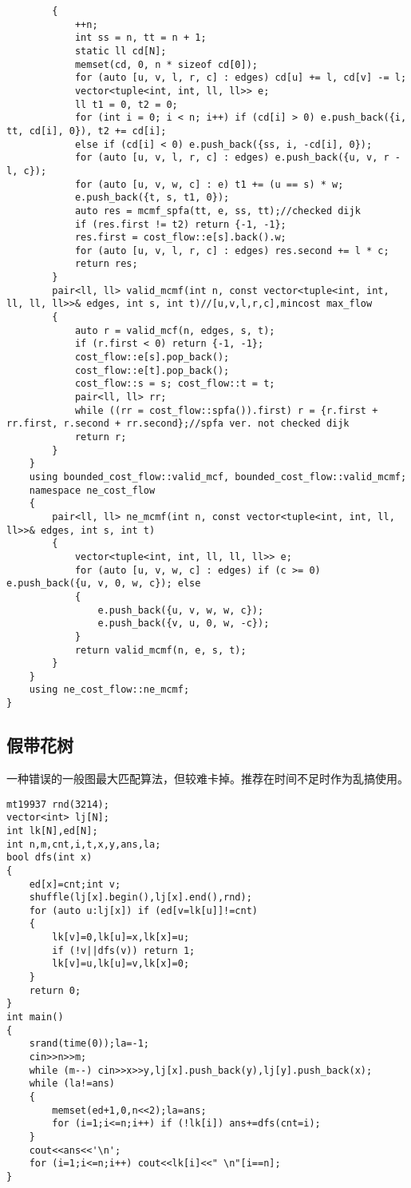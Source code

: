 \documentclass[12pt]{ctexart}
\begin{document}
\begin{lstlisting}
		{
			++n;
			int ss = n, tt = n + 1;
			static ll cd[N];
			memset(cd, 0, n * sizeof cd[0]);
			for (auto [u, v, l, r, c] : edges) cd[u] += l, cd[v] -= l;
			vector<tuple<int, int, ll, ll>> e;
			ll t1 = 0, t2 = 0;
			for (int i = 0; i < n; i++) if (cd[i] > 0) e.push_back({i, tt, cd[i], 0}), t2 += cd[i];
			else if (cd[i] < 0) e.push_back({ss, i, -cd[i], 0});
			for (auto [u, v, l, r, c] : edges) e.push_back({u, v, r - l, c});
			for (auto [u, v, w, c] : e) t1 += (u == s) * w;
			e.push_back({t, s, t1, 0});
			auto res = mcmf_spfa(tt, e, ss, tt);//checked dijk
			if (res.first != t2) return {-1, -1};
			res.first = cost_flow::e[s].back().w;
			for (auto [u, v, l, r, c] : edges) res.second += l * c;
			return res;
		}
		pair<ll, ll> valid_mcmf(int n, const vector<tuple<int, int, ll, ll, ll>>& edges, int s, int t)//[u,v,l,r,c],mincost max_flow
		{
			auto r = valid_mcf(n, edges, s, t);
			if (r.first < 0) return {-1, -1};
			cost_flow::e[s].pop_back();
			cost_flow::e[t].pop_back();
			cost_flow::s = s; cost_flow::t = t;
			pair<ll, ll> rr;
			while ((rr = cost_flow::spfa()).first) r = {r.first + rr.first, r.second + rr.second};//spfa ver. not checked dijk
			return r;
		}
	}
	using bounded_cost_flow::valid_mcf, bounded_cost_flow::valid_mcmf;
	namespace ne_cost_flow
	{
		pair<ll, ll> ne_mcmf(int n, const vector<tuple<int, int, ll, ll>>& edges, int s, int t)
		{
			vector<tuple<int, int, ll, ll, ll>> e;
			for (auto [u, v, w, c] : edges) if (c >= 0) e.push_back({u, v, 0, w, c}); else
			{
				e.push_back({u, v, w, w, c});
				e.push_back({v, u, 0, w, -c});
			}
			return valid_mcmf(n, e, s, t);
		}
	}
	using ne_cost_flow::ne_mcmf;
}
\end{lstlisting}


\subsection{假带花树}

一种错误的一般图最大匹配算法，但较难卡掉。推荐在时间不足时作为乱搞使用。

\begin{lstlisting}
mt19937 rnd(3214);
vector<int> lj[N];
int lk[N],ed[N];
int n,m,cnt,i,t,x,y,ans,la;
bool dfs(int x)
{
	ed[x]=cnt;int v;
	shuffle(lj[x].begin(),lj[x].end(),rnd);
	for (auto u:lj[x]) if (ed[v=lk[u]]!=cnt)
	{
		lk[v]=0,lk[u]=x,lk[x]=u;
		if (!v||dfs(v)) return 1;
		lk[v]=u,lk[u]=v,lk[x]=0;
	}
	return 0;
}
int main()
{
	srand(time(0));la=-1;
	cin>>n>>m;
	while (m--) cin>>x>>y,lj[x].push_back(y),lj[y].push_back(x);
	while (la!=ans)
	{
		memset(ed+1,0,n<<2);la=ans;
		for (i=1;i<=n;i++) if (!lk[i]) ans+=dfs(cnt=i);
	}
	cout<<ans<<'\n';
	for (i=1;i<=n;i++) cout<<lk[i]<<" \n"[i==n];
}
\end{lstlisting}
\end{document}
